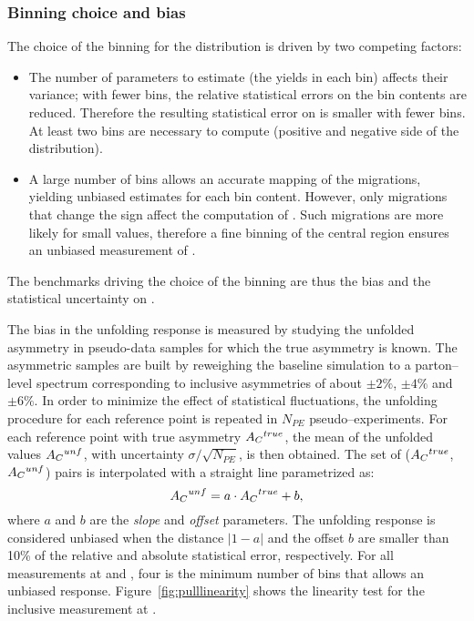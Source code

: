 \subsubsection{Binning choice and bias}

The choice of the binning for the \dy{} distribution is driven by two
competing factors:
\begin{itemize}
\item The number of parameters to estimate (the yields in each \dy{}
  bin) affects their variance; with fewer bins, the relative statistical
  errors on the bin contents are reduced. Therefore the resulting
  statistical error on \ac{} is smaller with fewer bins. At least two
  bins are necessary to compute \ac{} (positive and negative side of
  the \dy{} distribution).
\item A large number of bins allows an accurate mapping of the
  migrations, yielding unbiased estimates for each bin
  content. However, only migrations that change the \dy{} sign affect
  the computation of \ac{}. Such migrations are more likely for small
  \dy{} values, therefore a fine binning of the central \dy{} region
  ensures an unbiased measurement of \ac{}. 
\end{itemize}
The benchmarks driving the choice of the binning are thus the bias and
the statistical uncertainty on \ac{}.

The bias in the unfolding response is measured by studying the
unfolded asymmetry in pseudo-data samples for which the true
asymmetry is known. The asymmetric samples are built by reweighing the
baseline \ttbar{} simulation to a parton--level \dy{} spectrum
corresponding to inclusive asymmetries of about $\pm2\%$, $\pm4\%$ and
$\pm6\%$.
In order to minimize the effect of statistical fluctuations, the
unfolding procedure for each reference point is repeated in $N_{PE}$
pseudo--experiments. For each reference point with true asymmetry
$A_C{}^{true}$, the mean of the unfolded values $A_C{}^{unf}$, with
uncertainty $\sigma/\sqrt{N_{PE}}$, is then obtained. The set of
($A_C{}^{true}$,$A_C{}^{unf}$) pairs is interpolated with a straight
line parametrized as:
\begin{equation}
A_C{}^{unf}=a\cdot{}A_C{}^{true}+b,
\end{equation}
where $a$ and $b$ are the {\it slope} and {\it offset} parameters.
The unfolding response is considered unbiased when the distance
$|1-a|$ and the offset $b$ are smaller than 10\% of the relative and
absolute statistical error, respectively.
For all measurements at \seventev{} and \eighttev{}, four is the
minimum number of \dy{} bins that allows an unbiased
response. Figure~\ref{fig:pulllinearity} shows the linearity test for
the inclusive \ac{} measurement at \eighttev{}.

